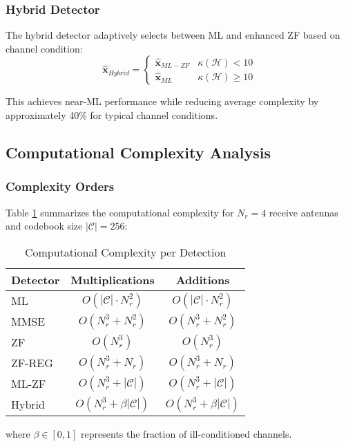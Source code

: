 \subsubsection{Hybrid Detector}
The hybrid detector adaptively selects between ML and enhanced ZF based on channel condition:
\begin{equation}
\hat{\mathbf{x}}_{Hybrid} = \begin{cases}
\hat{\mathbf{x}}_{ML-ZF} & \kappa(\mathcal{H}) < 10 \\
\hat{\mathbf{x}}_{ML} & \kappa(\mathcal{H}) \geq 10
\end{cases}
\end{equation}

This achieves near-ML performance while reducing average complexity by approximately 40\% for typical channel conditions.

\subsection{Computational Complexity Analysis}

\subsubsection{Complexity Orders}
Table \ref{tab:complexity} summarizes the computational complexity for $N_r = 4$ receive antennas and codebook size $|\mathcal{C}| = 256$:

\begin{table}[h]
\caption{Computational Complexity per Detection}
\label{tab:complexity}
\centering
\begin{tabular}{|l|c|c|}
\hline
\textbf{Detector} & \textbf{Multiplications} & \textbf{Additions} \\
\hline
ML & $O(|\mathcal{C}| \cdot N_r^2)$ & $O(|\mathcal{C}| \cdot N_r^2)$ \\
MMSE & $O(N_r^3 + N_r^2)$ & $O(N_r^3 + N_r^2)$ \\
ZF & $O(N_r^3)$ & $O(N_r^3)$ \\
ZF-REG & $O(N_r^3 + N_r)$ & $O(N_r^3 + N_r)$ \\
ML-ZF & $O(N_r^3 + |\mathcal{C}|)$ & $O(N_r^3 + |\mathcal{C}|)$ \\
Hybrid & $O(N_r^3 + \beta|\mathcal{C}|)$ & $O(N_r^3 + \beta|\mathcal{C}|)$ \\
\hline
\end{tabular}
\end{table}
where $\beta \in [0,1]$ represents the fraction of ill-conditioned channels.

